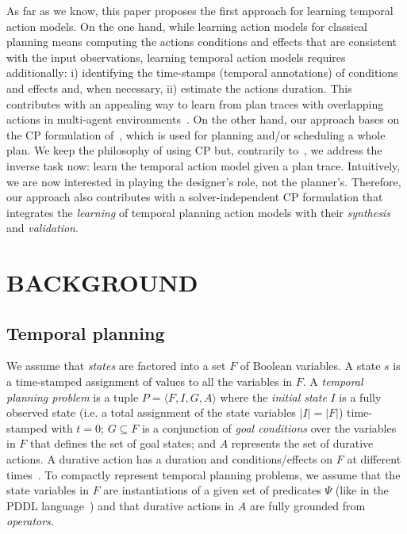 \documentclass{ecai}
\newcommand{\tup}[1]{{\langle #1 \rangle}}
\begin{document}
As far as we know, this paper proposes the first approach for learning temporal action models. On the one hand, while learning action models for classical planning means computing the actions conditions and effects that are consistent with the input observations, learning temporal action models requires additionally: i) identifying the time-stamps (temporal annotations) of conditions and effects and, when necessary, ii) estimate the actions duration. 
This contributes with an appealing way to learn from plan traces with overlapping actions in multi-agent environments~\cite{furelos2018carpool}. 
On the other hand, our approach bases on the CP formulation of~\cite{garrido2009constraint}, which is used for planning and/or scheduling a whole plan. We keep the philosophy of using CP but, contrarily to~\cite{garrido2009constraint}, we address the inverse task now: learn the temporal action model given a plan trace. Intuitively, we are now interested in playing the designer's role, not the planner's.
Therefore, our approach also contributes with a solver-independent CP formulation that integrates the {\em learning} of temporal planning action models with their {\em synthesis} and {\em validation}.



\section{BACKGROUND}


\subsection{Temporal planning}
\label{sec:temporalplanning}

We assume that {\em states} are factored into a set $F$ of Boolean variables. A state $s$ is a time-stamped assignment of values to all the variables in $F$. A {\em temporal planning problem} is a tuple $P=\tup{F,I,G,A}$ where the {\em initial state} $I$ is a fully observed state (i.e. a total assignment of the state variables $|I|=|F|$) time-stamped with $t=0$; $G \subseteq F$ is a conjunction of {\em goal conditions} over the variables in $F$ that defines the set of goal states; and $A$ represents the set of durative actions.
A durative action has a duration and conditions/effects on $F$ at different times~\cite{garrido2009constraint,vidal2006branching}. To compactly represent temporal planning problems, we assume that the state variables in $F$ are instantiations of a given set of predicates $\Psi$ (like in the PDDL language~\cite{younes2004ppddl1}) and that durative actions in $A$ are fully grounded from {\em operators}.
\end{document}
